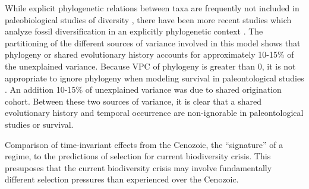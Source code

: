 \documentclass[12pt,letterpaper]{article}
\begin{document}
While explicit phylogenetic relations between taxa are frequently not included in paleobiological studies of diversity \citep{Alroy2009,Foote2013,Jablonski2006a,Hunt2007a,Liow2008,Payne2007,Alroy2000g,Jernvall2002,Jernvall2004,Marcot2014}, there have been more recent studies which analyze fossil diversification in an explicitly phylogenetic context \citep{Slater2012,Slater2013a,Tomiya2013,Harnik2014,Simpson2011a}. The partitioning of the different sources of variance involved in this model shows that phylogeny or shared evolutionary history accounts for approximately 10-15\% of the unexplained variance. Because VPC of phylogeny is greater than 0, it is not appropriate to ignore phylogeny when modeling survival in paleontological studies \citep{Housworth2004}. An addition 10-15\% of unexplained variance was due to shared origination cohort. Between these two sources of variance, it is clear that a shared evolutionary history and temporal occurrence are non-ignorable in paleontological studies or survival.


Comparison of time-invariant effects from the Cenozoic, the ``signature'' of a regime, to the predictions of selection for current biodiversity crisis. This presuposes that the current biodiversity crisis may involve fundamentally different selection pressures than experienced over the Cenozoic.
\end{document}
